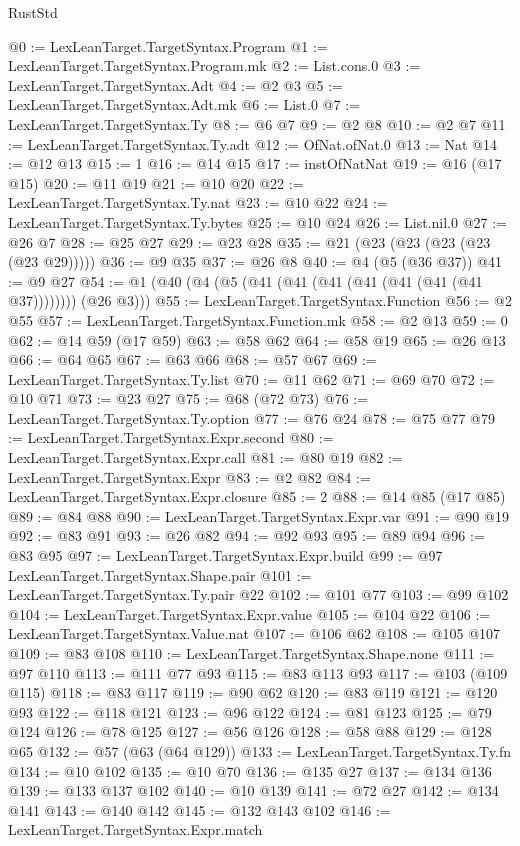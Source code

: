 \begin{lexlean}{RustStd}
\begin{coremodule}
@0 := LexLeanTarget.TargetSyntax.Program
@1 := LexLeanTarget.TargetSyntax.Program.mk
@2 := List.cons.{0}
@3 := LexLeanTarget.TargetSyntax.Adt
@4 := @2 @3
@5 := LexLeanTarget.TargetSyntax.Adt.mk
@6 := List.{0}
@7 := LexLeanTarget.TargetSyntax.Ty
@8 := @6 @7
@9 := @2 @8
@10 := @2 @7
@11 := LexLeanTarget.TargetSyntax.Ty.adt
@12 := OfNat.ofNat.{0}
@13 := Nat
@14 := @12 @13
@15 := 1
@16 := @14 @15
@17 := instOfNatNat
@19 := @16 (@17 @15)
@20 := @11 @19
@21 := @10 @20
@22 := LexLeanTarget.TargetSyntax.Ty.nat
@23 := @10 @22
@24 := LexLeanTarget.TargetSyntax.Ty.bytes
@25 := @10 @24
@26 := List.nil.{0}
@27 := @26 @7
@28 := @25 @27
@29 := @23 @28
@35 := @21 (@23 (@23 (@23 (@23 (@23 @29)))))
@36 := @9 @35
@37 := @26 @8
@40 := @4 (@5 (@36 @37))
@41 := @9 @27
@54 := @1 (@40 (@4 (@5 (@41 (@41 (@41 (@41 (@41 (@41 (@41 @37)))))))) (@26 @3)))
@55 := LexLeanTarget.TargetSyntax.Function
@56 := @2 @55
@57 := LexLeanTarget.TargetSyntax.Function.mk
@58 := @2 @13
@59 := 0
@62 := @14 @59 (@17 @59)
@63 := @58 @62
@64 := @58 @19
@65 := @26 @13
@66 := @64 @65
@67 := @63 @66
@68 := @57 @67
@69 := LexLeanTarget.TargetSyntax.Ty.list
@70 := @11 @62
@71 := @69 @70
@72 := @10 @71
@73 := @23 @27
@75 := @68 (@72 @73)
@76 := LexLeanTarget.TargetSyntax.Ty.option
@77 := @76 @24
@78 := @75 @77
@79 := LexLeanTarget.TargetSyntax.Expr.second
@80 := LexLeanTarget.TargetSyntax.Expr.call
@81 := @80 @19
@82 := LexLeanTarget.TargetSyntax.Expr
@83 := @2 @82
@84 := LexLeanTarget.TargetSyntax.Expr.closure
@85 := 2
@88 := @14 @85 (@17 @85)
@89 := @84 @88
@90 := LexLeanTarget.TargetSyntax.Expr.var
@91 := @90 @19
@92 := @83 @91
@93 := @26 @82
@94 := @92 @93
@95 := @89 @94
@96 := @83 @95
@97 := LexLeanTarget.TargetSyntax.Expr.build
@99 := @97 LexLeanTarget.TargetSyntax.Shape.pair
@101 := LexLeanTarget.TargetSyntax.Ty.pair @22
@102 := @101 @77
@103 := @99 @102
@104 := LexLeanTarget.TargetSyntax.Expr.value
@105 := @104 @22
@106 := LexLeanTarget.TargetSyntax.Value.nat
@107 := @106 @62
@108 := @105 @107
@109 := @83 @108
@110 := LexLeanTarget.TargetSyntax.Shape.none
@111 := @97 @110
@113 := @111 @77 @93
@115 := @83 @113 @93
@117 := @103 (@109 @115)
@118 := @83 @117
@119 := @90 @62
@120 := @83 @119
@121 := @120 @93
@122 := @118 @121
@123 := @96 @122
@124 := @81 @123
@125 := @79 @124
@126 := @78 @125
@127 := @56 @126
@128 := @58 @88
@129 := @128 @65
@132 := @57 (@63 (@64 @129))
@133 := LexLeanTarget.TargetSyntax.Ty.fn
@134 := @10 @102
@135 := @10 @70
@136 := @135 @27
@137 := @134 @136
@139 := @133 @137 @102
@140 := @10 @139
@141 := @72 @27
@142 := @134 @141
@143 := @140 @142
@145 := @132 @143 @102
@146 := LexLeanTarget.TargetSyntax.Expr.match

\end{coremodule}
\end{lexlean}
